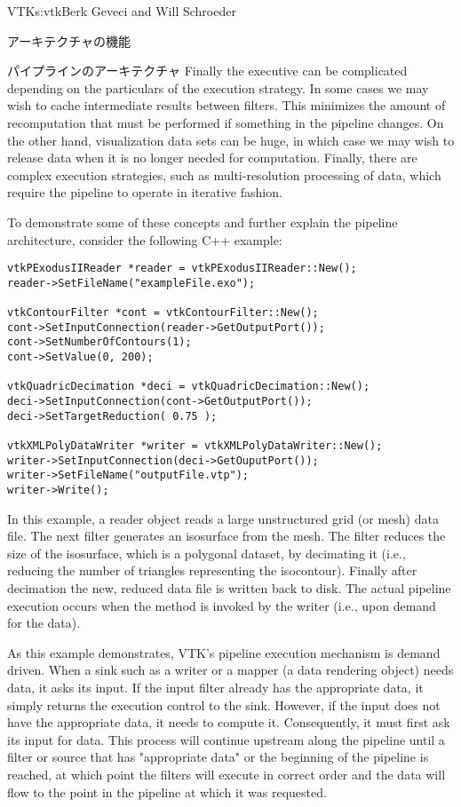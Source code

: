 \begin{aosachapter}{VTK}{s:vtk}{Berk Geveci and Will Schroeder}
\begin{aosasect1}{アーキテクチャの機能}
\begin{aosasect2}{パイプラインのアーキテクチャ}
Finally the executive can be complicated depending on the particulars
of the execution strategy. In some cases we may wish to cache
intermediate results between filters. This minimizes the amount of
recomputation that must be performed if something in the pipeline
changes. On the other hand, visualization data sets can be huge, in
which case we may wish to release data when it is no longer needed for
computation. Finally, there are complex execution strategies, such as
multi-resolution processing of data, which require the pipeline to
operate in iterative fashion.

To demonstrate some of these concepts and further explain the pipeline
architecture, consider the following C++ example:

\begin{verbatim}
vtkPExodusIIReader *reader = vtkPExodusIIReader::New();
reader->SetFileName("exampleFile.exo");

vtkContourFilter *cont = vtkContourFilter::New();
cont->SetInputConnection(reader->GetOutputPort());
cont->SetNumberOfContours(1);
cont->SetValue(0, 200);

vtkQuadricDecimation *deci = vtkQuadricDecimation::New();
deci->SetInputConnection(cont->GetOutputPort());
deci->SetTargetReduction( 0.75 );

vtkXMLPolyDataWriter *writer = vtkXMLPolyDataWriter::New();
writer->SetInputConnection(deci->GetOuputPort());
writer->SetFileName("outputFile.vtp");
writer->Write();
\end{verbatim}

\noindent In this example, a reader object reads a large unstructured grid (or
mesh) data file. The next filter generates an isosurface from the
mesh. The  filter reduces the size of the
isosurface, which is a polygonal dataset, by decimating it (i.e.,
reducing the number of triangles representing the isocontour). Finally
after decimation the new, reduced data file is written back to
disk. The actual pipeline execution occurs when the 
method is invoked by the writer (i.e., upon demand for the data).

As this example demonstrates, VTK's pipeline execution mechanism is
demand driven. When a sink such as a writer or a mapper (a data
rendering object) needs data, it asks its input. If the input filter
already has the appropriate data, it simply returns the execution
control to the sink. However, if the input does not have the
appropriate data, it needs to compute it. Consequently, it must first
ask its input for data. This process will continue upstream along the
pipeline until a filter or source that has "appropriate data" or the
beginning of the pipeline is reached, at which point the filters will
execute in correct order and the data will flow to the point in the
pipeline at which it was requested.


\end{aosasect2}
\end{aosasect1}
\end{aosachapter}
